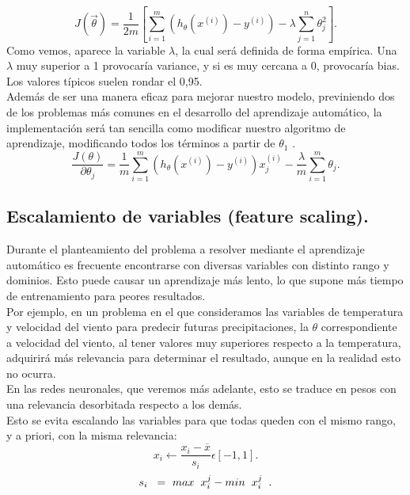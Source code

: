 \documentclass[a4paper,11pt]{article}
\begin{document}
\[
J(\vec{\theta})=\frac{1}{2m}\left[\sum_{i=1}^{m} \left(h_\theta (x^{(i)})-y^{(i)}\right)-\lambda \sum_{j=1}^{n}\theta_{j}^2\right].
\]
Como vemos, aparece la variable $\lambda$, la cual será definida de forma empírica. Una $\lambda$ muy superior a 1 provocaría variance, y si es muy cercana a 0, provocaría bias. Los valores típicos suelen rondar el 0,95.\\

\noindent
Además de ser una manera eficaz para mejorar nuestro modelo, previniendo dos de los problemas más comunes en el desarrollo del aprendizaje automático, la implementación será tan sencilla como modificar nuestro algoritmo de aprendizaje, modificando todos los términos a partir de $\theta_1$ .\\
\[
\frac{J(\theta)}{\partial\theta_j} = \frac{1}{m} \sum_{i=1}^{m} \left(h_\theta (x^{(i)})-y^{(i)}\right) x_{j}^{(i)}-\frac{\lambda}{m} \sum_{i=1}^{m} \theta_j.
\]

\subsection{Escalamiento de variables (feature scaling).}

Durante el planteamiento del problema a resolver mediante el aprendizaje automático es frecuente encontrarse con diversas variables con distinto rango y dominios. Esto puede causar un aprendizaje más lento, lo que supone más tiempo de entrenamiento para peores resultados. \\

\noindent
Por ejemplo, en un problema en el que consideramos las variables de temperatura y velocidad del viento para predecir futuras precipitaciones, la $\theta$ correspondiente a  velocidad del viento, al tener valores muy superiores respecto a la temperatura, adquirirá más relevancia para determinar el resultado, aunque en la realidad esto no ocurra.\\ 

\noindent
En las redes neuronales, que veremos más adelante, esto se traduce en pesos con una relevancia desorbitada respecto a los demás.\\

\noindent
Esto se evita escalando las variables para que todas queden con el mismo rango, y a priori, con la misma relevancia:
\[
x_i \longleftarrow \frac{x_i - \overline{x}}{s_i} \epsilon [-1,1].
\]
\hspace{0.20cm}
\[
s_i \hspace{0.20cm} = \  max\hspace{0.20cm}x_{i}^j -min\hspace{0.20cm}x_{i}^j \hspace{0.20cm}.
\]
\newpage
\end{document}
